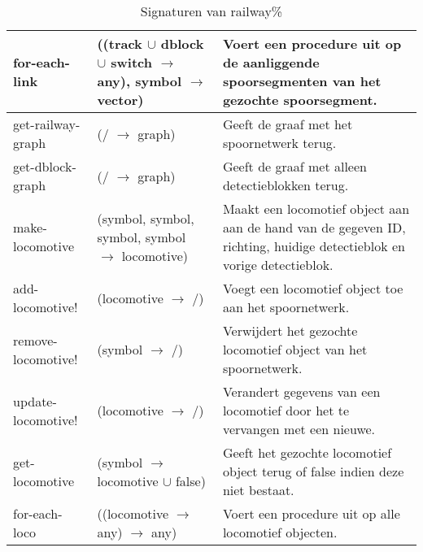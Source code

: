 \documentclass{article}
\begin{document}
\begin{table}[h!]
\begin{tabular}{|p{2.9cm}|p{4cm}|p{6.1cm}|}
                \hline
                for-each-link &  ((track $\cup$ dblock $\cup$ switch $\rightarrow$ any), symbol $\rightarrow$ vector) & Voert een procedure uit op de aanliggende spoorsegmenten van het gezochte spoorsegment.\\   
                \hline
                get-railway-graph & (/ $\rightarrow$ graph) & Geeft de graaf met het spoornetwerk terug.\\
                \hline
                get-dblock-graph & (/ $\rightarrow$ graph) & Geeft de graaf met alleen detectieblokken terug. \\
                \hline
                make-locomotive & (symbol, symbol, symbol, symbol $\rightarrow$ locomotive) & Maakt een locomotief object aan aan de hand van de gegeven
                ID, richting, huidige detectieblok en vorige detectieblok. \\
                \hline
                add-locomotive! & (locomotive $\rightarrow$ /) & Voegt een locomotief object toe aan het spoornetwerk.\\
                \hline
                remove-locomotive! & (symbol $\rightarrow$ /) & Verwijdert het gezochte locomotief object van het spoornetwerk. \\
                \hline
                update-locomotive! & (locomotive $\rightarrow$ /) & Verandert gegevens van een locomotief door het te vervangen met een nieuwe. \\
                \hline
                get-locomotive & (symbol $\rightarrow$ locomotive $\cup$ false) & Geeft het gezochte locomotief object terug of false indien deze niet bestaat. \\
                \hline
                for-each-loco & ((locomotive $\rightarrow$ any) $\rightarrow$ any) & Voert een procedure uit op alle locomotief objecten. \\
                \hline
        \end{tabular}
        \caption{Signaturen van railway\%}
\end{table}
\end{document}
